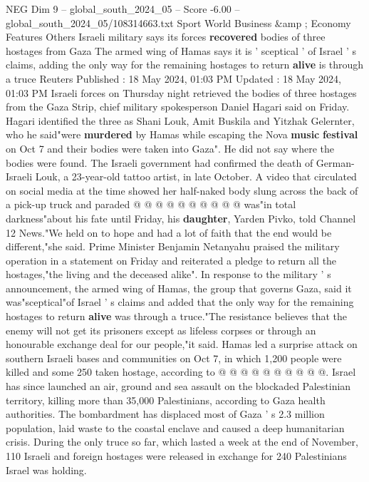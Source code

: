 \begin{textsample}{NEG Dim 9 – global\_south\_2024\_05 – Score -6.00 – global\_south\_2024\_05/108314663.txt}  \label{ex:f9_neg_403}
Sport World Business \&amp ; Economy Features Others Israeli military says its forces \textbf{recovered} bodies of three hostages from Gaza The armed wing of Hamas says it is ' sceptical ' of Israel ' s claims, adding the only way for the remaining hostages to return \textbf{alive} is through a truce Reuters Published : 18 May 2024, 01:03 PM Updated : 18 May 2024, 01:03 PM Israeli forces on Thursday night retrieved the bodies of three hostages from the Gaza Strip, chief military spokesperson Daniel Hagari said on Friday.
Hagari identified the three as Shani Louk, Amit Buskila and Yitzhak Gelernter, who he said"were \textbf{murdered} by Hamas while escaping the Nova \textbf{music} \textbf{festival} on Oct 7 and their bodies were taken into Gaza".
He did not say where the bodies were found.
The Israeli government had confirmed the death of German-Israeli Louk, a 23-year-old tattoo artist, in late October.
A video that circulated on social media at the time showed her half-naked body slung across the back of a pick-up truck and paraded @ @ @ @ @ @ @ @ @ @ was"in total darkness"about his fate until Friday, his \textbf{daughter}, Yarden Pivko, told Channel 12 News."We held on to hope and had a lot of faith that the end would be different,"she said.
Prime Minister Benjamin Netanyahu praised the military operation in a statement on Friday and reiterated a pledge to return all the hostages,"the living and the deceased alike".
In response to the military ' s announcement, the armed wing of Hamas, the group that governs Gaza, said it was"sceptical"of Israel ' s claims and added that the only way for the remaining hostages to return \textbf{alive} was through a truce."The resistance believes that the enemy will not get its prisoners except as lifeless corpses or through an honourable exchange deal for our people,"it said.
Hamas led a surprise attack on southern Israeli bases and communities on Oct 7, in which 1,200 people were killed and some 250 taken hostage, according to @ @ @ @ @ @ @ @ @ @.
Israel has since launched an air, ground and sea assault on the blockaded Palestinian territory, killing more than 35,000 Palestinians, according to Gaza health authorities.
The bombardment has displaced most of Gaza ' s 2.3 million population, laid waste to the coastal enclave and caused a deep humanitarian crisis.
During the only truce so far, which lasted a week at the end of November, 110 Israeli and foreign hostages were released in exchange for 240 Palestinians Israel was holding.

\end{textsample}
